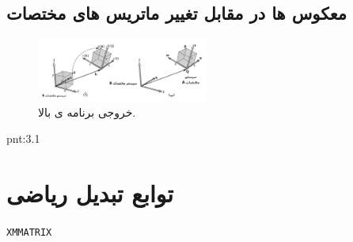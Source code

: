 \subsection{\textbf{معکوس ها در مقابل تغییر ماتریس های مختصات}}
{
    \Large
    \begin{spacing}{1.5}
        \begin{flushleft}
        \end{flushleft}

        \begin{figure}[H]
            \centering
            \setlength{\belowcaptionskip}{-10pt}
            \includegraphics[width=0.5\textwidth]{Images/4/3/4.Session.1.3.15}
            \caption {خروجی برنامه ی بالا.}
            \label{fig:4.Session.1.3.13}
        \end{figure}

        \begin{point}{pnt:3.1}
            \Large
        \end{point}

    \end{spacing}
}


\section{\textbf{توابع تبدیل ریاضی }}
\label{sec:3.5}
{
    \Large
    \begin{spacing}{1.5}

        \textbf{\vspace{6pt}}
        \lr{}
        \textbf{\vspace{6pt}}

        \texttt{XMMATRIX}

    \end{spacing}
}
\newpage


